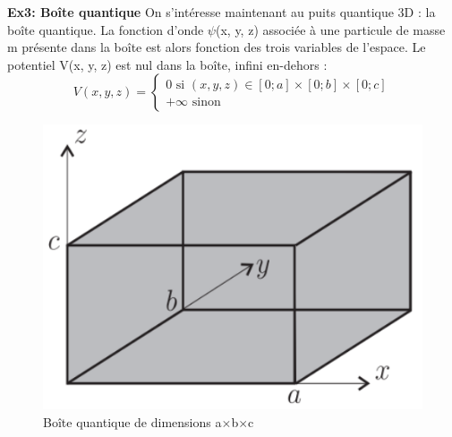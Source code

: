 \documentclass{article}
\begin{document}
\noindent\textbf{Ex3: Boîte quantique}\newline
On s’intéresse maintenant au puits quantique 3D : la boîte quantique. La fonction d’onde $\psi$(x, y, z) associée à une particule de masse m présente dans la boîte est alors fonction des trois variables de l’espace. Le potentiel V(x, y, z) est nul dans la boîte, infini en-dehors :
\[ V(x,y,z)= \left\{
    \begin{array}{c}
        0 \text{ si } (x,y,z) \in [0;a] \times [0;b] \times [0;c] \\
        +\infty \text{ sinon}
    \end{array}
\]

\begin{figure}[h]
    \centering
    \includegraphics[scale=0.3]{figure2.png}
    \caption{Boîte quantique de dimensions a$\times$b$\times$c}
\end{figure}
\end{document}
